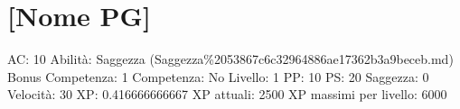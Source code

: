 \section{{[}Nome PG{]}}\label{nome-pg}

AC: 10 Abilità: Saggezza
(Saggezza\%2053867c6c32964886ae17362b3a9beceb.md) Bonus Competenza: 1
Competenza: No Livello: 1 PP: 10 PS: 20 Saggezza: 0 Velocità: 30 XP:
0.416666666667 XP attuali: 2500 XP massimi per livello: 6000
